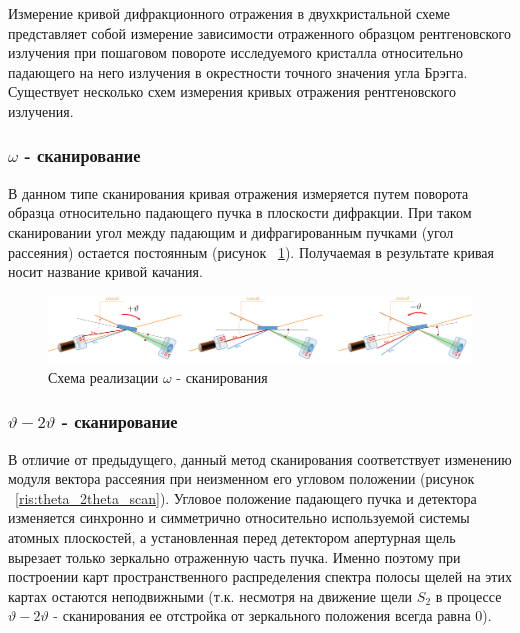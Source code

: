 

Измерение кривой дифракционного отражения в двухкристальной схеме представляет
собой измерение зависимости отраженного образцом рентгеновского излучения при
пошаговом повороте исследуемого кристалла относительно падающего на него
излучения в окрестности точного значения угла Брэгга.
Существует несколько схем измерения кривых отражения рентгеновского излучения.

\subsubsection*{$\omega$ - сканирование}
В данном типе сканирования кривая отражения измеряется путем поворота образца
относительно падающего пучка в плоскости дифракции. При таком сканировании
угол между падающим и дифрагированным пучками (угол рассеяния) остается постоянным
(рисунок ~\ref{ris:omega_scan}). Получаемая в результате кривая носит название кривой качания.


\begin{figure}[H]
  \centering
  \includegraphics[width=1\textwidth]{images/omega_scan.png}
  \caption{Схема реализации $\omega $ - сканирования}
  \label{ris:omega_scan}
\end{figure}

\subsubsection*{$\vartheta - 2\vartheta$ - сканирование}
В отличие от предыдущего, данный метод сканирования соответствует изменению
 модуля вектора рассеяния при неизменном его угловом положении
 (рисунок ~\ref{ris:theta_2theta_scan}). Угловое положение падающего пучка и
 детектора изменяется синхронно и симметрично относительно используемой системы
 атомных плоскостей, а установленная перед детектором апертурная щель вырезает
  только зеркально отраженную часть пучка. Именно поэтому при построении карт
   пространственного распределения спектра полосы щелей на этих картах остаются
   неподвижными (т.к. несмотря на движение щели  $S_2$ в процессе
    $\vartheta - 2\vartheta$ -  сканирования ее отстройка от зеркального
    положения всегда равна 0).

